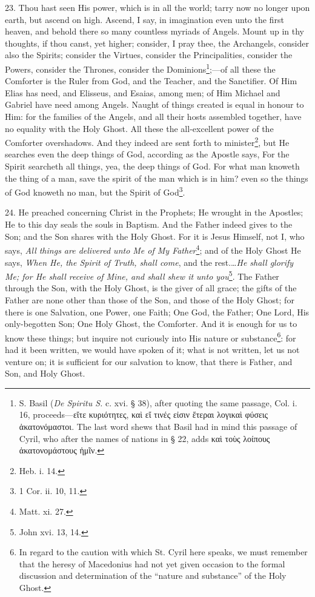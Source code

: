 23. Thou hast seen His power, which is in all the world; tarry now no longer upon earth, but ascend on high. Ascend, I say, in imagination even unto the first heaven, and behold there so many countless myriads of Angels. Mount up in thy thoughts, if thou canst, yet higher; consider, I pray thee, the Archangels, consider also the Spirits; consider the Virtues, consider the Principalities, consider the Powers, consider the Thrones, consider the Dominions\footnote{S. Basil (\emph{De Spiritu S.} c. xvi. § 38), after quoting the same passage, Col. i. 16, proceeds—\textgreek{εἴτε κυριότητες, καὶ εἴ τινές εἰσιν ἕτεραι λογικαὶ φύσεις ἁκατονόμαστοι}. The last word shews that Basil had in mind this passage of Cyril, who after the names of nations in § 22, adds \textgreek{καὶ τοὺς λοίπους ἀκατονομάστους ἡμῖν}.};—of all these the Comforter is the Ruler from God, and the Teacher, and the Sanctifier. Of Him Elias has need, and Elisseus, and Esaias, among men; of Him Michael and Gabriel have need among Angels. Naught of things created is equal in honour to Him: for the families of the Angels, and all their hosts assembled together, have no equality with the Holy Ghost. All these the all-excellent power of the Comforter overshadows. And they indeed are sent forth to minister\footnote{Heb. i. 14.}, but He searches even the deep things of God, according as the Apostle says, For the Spirit searcheth all things, yea, the deep things of God. For what man knoweth the thing of a man, save the spirit of the man which is in him? even so the things of God knoweth no man, but the Spirit of God\footnote{1 Cor. ii. 10, 11.}.

24. He preached concerning Christ in the Prophets; He wrought in the Apostles; He to this day seals the souls in Baptism. And the Father indeed gives to the Son; and the Son shares with the Holy Ghost. For it is Jesus Himself, not I, who says, \emph{All things are delivered unto Me of My Father}\footnote{Matt. xi. 27.}; and of the Holy Ghost He says, \emph{When He, the Spirit of Truth, shall come}, and the rest.…\emph{He shall glorify Me; for He shall receive of Mine, and shall shew it unto you}\footnote{John xvi. 13, 14.}. The Father through the Son, with the Holy Ghost, is the giver of all grace; the gifts of the Father are none other than those of the Son, and those of the Holy Ghost; for there is one Salvation, one Power, one Faith; One God, the Father; One Lord, His only-begotten Son; One Holy Ghost, the Comforter. And it is enough for us to know these things; but inquire not curiously into His nature or substance\footnote{In regard to the caution with which St. Cyril here speaks, we must remember that the heresy of Macedonius had not yet given occasion to the formal discussion and determination of the “nature and substance” of the Holy Ghost.}: for had it been written, we would have spoken of it; what is not written, let us not venture on; it is sufficient for our salvation to know, that there is Father, and Son, and Holy Ghost.


